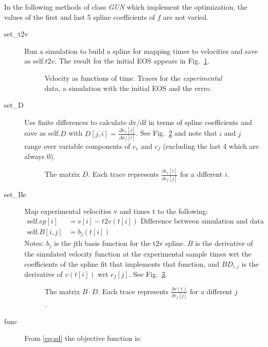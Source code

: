 \documentclass[11pt]{article}
\begin{document}
In the following methods of class \emph{GUN} which implement the
optimization, the values of the first and last 5 spline coefficients
of $f$ are not varied.
\begin{description}
\item[set\_t2v] Run a simulation to build a spline for mapping times to
  velocities and save as self.$t2v$.  The result for the initial EOS
  appears in Fig.~\ref{fig:vt_test}.
  \begin{figure}
    \centering
    \caption{Velocity as functions of time.  Traces for the
      \emph{experimental} data, a simulation with the initial EOS and
      the errro.}
    \label{fig:vt_test}
  \end{figure}
\item[set\_D] Use finite differences to calculate dv/df in terms of
  spline coefficients and save as self.$D$ with
  $D[j,i] = \frac{\Delta c_v[j]}{\Delta c_f[i]}$.  See
  Fig.~\ref{fig:D_test} and note that $i$ and $j$ range over variable
  components of $c_v$ and $c_f$ (excluding the last 4 which are always
  0).
  \begin{figure}
    \centering
    \caption{The matrix $D$.  Each trace represents
      $\frac{\partial c_v[i]}{\partial c_f[j]}$ for a different $i$.}
    \label{fig:D_test}
  \end{figure}
\item[set\_Be] Map experimental velocities v and times t to the
  following:
  \begin{align*}        
    \text{self.}ep[i] &= v[i] - t2v(t[i]) \text{ Difference between simulation
                and data} \\
    \text{self.}B[i,j] &= b_j(t[i])     
  \end{align*}
  Notes: $b_j$ is the jth basis function for the t2v spline.  $B$ is
  the derivative of the simulated velocity function at the
  experimental sample times wrt the coefficients of the spline fit
  that implements that function, and $BD_{i,j}$ is the derivative of
  $v(t[i])$ wrt $c_f[j]$.  See Fig.~\ref{fig:BD_test}.
  \begin{figure}
    \centering
    \caption{The matrix $B\cdot D$.  Each trace represents
      $\frac{\partial v(t)}{\partial c_f[j]}$ for a different $j$.}
    \label{fig:BD_test}
  \end{figure}
\item[func] From \eqref{eq:sd} the objective function is:

\end{description}
\end{document}
